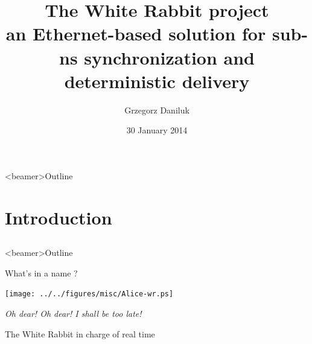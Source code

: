 \documentclass[compress,red]{beamer}
\title[White Rabbit \hspace{2em}\insertframenumber/\inserttotalframenumber]
{The White Rabbit project\\ \small an Ethernet-based solution for sub-ns synchronization and deterministic delivery}
\author[G. Daniluk]{Grzegorz Daniluk}
\institute{CERN BE-CO Hardware and Timing section}
\date{30 January 2014}
\begin{document}
\frame{\titlepage}
\begin{frame}<beamer>{Outline}
    \tableofcontents %
\end{frame}

\section{Introduction}
\subsection{}
\begin{frame}<beamer>{Outline}
    \tableofcontents [currentsection]
\end{frame}


\begin{frame}{What's in a name ?}
\begin{center}
\texttt{[image: ../../figures/misc/Alice-wr.ps]}
\end{center}
\begin{center}
\textit{Oh dear! Oh dear! I shall be too late!}\\
\begin{small}
The White Rabbit in charge of real time
\end{small}
\end{center}
\end{frame}
\end{document}
